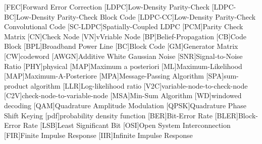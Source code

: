 \begin{acronym}
  [FEC]{Forward Error Correction}
  [LDPC]{Low-Density Parity-Check}
  [LDPC-BC]{Low-Density Parity-Check Block Code}
  [LDPC-CC]{Low-Density Parity-Check Convolutional Code}
  [SC-LDPC]{Spatially-Coupled LDPC}
  [PCM]{Parity Check Matrix}
  [CN]{Check Node}
  [VN]{vVriable Node}
  [BP]{Belief-Propagation}
  [CB]{Code Block}
  [BPL]{Broadband Power Line}
  [BC]{Block Code}
  [GM]{Generator Matrix}
  [CW]{codeword}
  [AWGN]{Additive White Gaussian Noise}
  [SNR]{Signal-to-Noise Ratio}
  [PHY]{physical}
  [MAP]{Maximum a posteriori}
  [ML]{Maximum-Likelihood}
  [MAP]{Maximum-A-Posteriore}
  [MPA]{Message-Passing Algorithm}
  [SPA]{sum-product algorithm}
  [LLR]{Log-likelihood ratio}
  [V2C]{variable-node-to-check-node}
  [C2V]{check-node-to-variable-node}
  [MSA]{Min-Sum Algorithm}
  [WD]{windowed decoding}
  [QAM]{Quadrature Amplitude Modulation}
  [QPSK]{Quadrature Phase Shift Keying}
  [pdf]{probability density function}
  [BER]{Bit-Error Rate}
  [BLER]{Block-Error Rate}
  [LSB]{Least Significant Bit}
  [OSI]{Open System Interconnection}
  [FIR]{Finite Impulse Response}
  [IIR]{Infinite Impulse Response}
\end{acronym}
